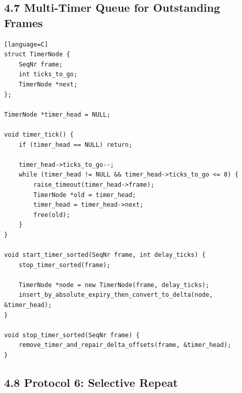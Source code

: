 \documentclass[11pt]{article}
\begin{document}
\subsection{4.7 Multi-Timer Queue for Outstanding
Frames}\label{multi-timer-queue-for-outstanding-frames}

\begin{verbatim}[language=C]
struct TimerNode {
    SeqNr frame;
    int ticks_to_go;
    TimerNode *next;
};

TimerNode *timer_head = NULL;

void timer_tick() {
    if (timer_head == NULL) return;

    timer_head->ticks_to_go--;
    while (timer_head != NULL && timer_head->ticks_to_go <= 0) {
        raise_timeout(timer_head->frame);
        TimerNode *old = timer_head;
        timer_head = timer_head->next;
        free(old);
    }
}

void start_timer_sorted(SeqNr frame, int delay_ticks) {
    stop_timer_sorted(frame);

    TimerNode *node = new TimerNode(frame, delay_ticks);
    insert_by_absolute_expiry_then_convert_to_delta(node, &timer_head);
}

void stop_timer_sorted(SeqNr frame) {
    remove_timer_and_repair_delta_offsets(frame, &timer_head);
}
\end{verbatim}

\subsection{4.8 Protocol 6: Selective
Repeat}\label{protocol-6-selective-repeat}
\end{document}
